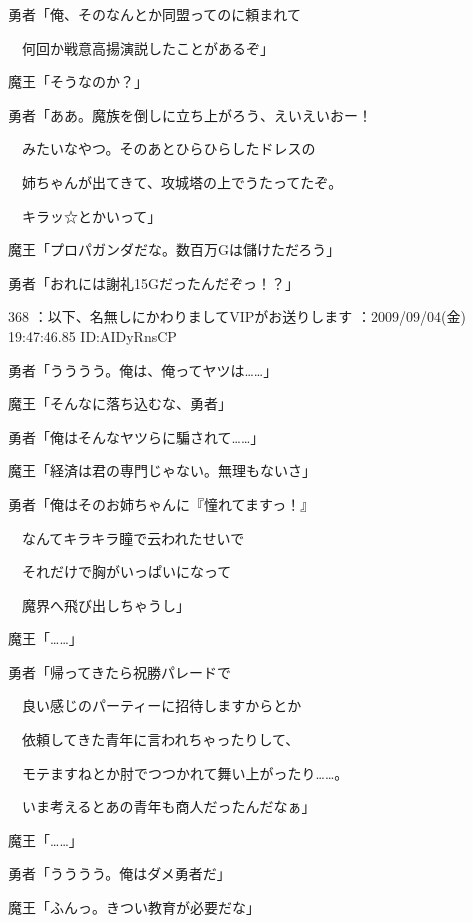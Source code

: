 \documentclass[a4j,twocolumn]{tarticle}
\begin{document}
勇者「俺、そのなんとか同盟ってのに頼まれて\par{} 
　何回か戦意高揚演説したことがあるぞ」 



魔王「そうなのか？」 



勇者「ああ。魔族を倒しに立ち上がろう、えいえいおー！\par{} 
　みたいなやつ。そのあとひらひらしたドレスの \par{}
　姉ちゃんが出てきて、攻城塔の上でうたってたぞ。\par{} 
　キラッ☆とかいって」 



魔王「プロパガンダだな。数百万Gは儲けただろう」\par{} 
勇者「おれには謝礼15Gだったんだぞっ！？」 

	
    
    

368 ：以下、名無しにかわりましてVIPがお送りします ：2009/09/04(金) 19:47:46.85 ID:AIDyRnsCP 


勇者「うううう。俺は、俺ってヤツは……」\par{} 
魔王「そんなに落ち込むな、勇者」 



勇者「俺はそんなヤツらに騙されて……」\par{} 
魔王「経済は君の専門じゃない。無理もないさ」 



勇者「俺はそのお姉ちゃんに『憧れてますっ！』\par{} 
　なんてキラキラ瞳で云われたせいで \par{}
　それだけで胸がいっぱいになって\par{} 
　魔界へ飛び出しちゃうし」 



魔王「……」 



勇者「帰ってきたら祝勝パレードで\par{} 
　良い感じのパーティーに招待しますからとか\par{} 
　依頼してきた青年に言われちゃったりして、\par{} 
　モテますねとか肘でつつかれて舞い上がったり……。\par{} 
　いま考えるとあの青年も商人だったんだなぁ」 



魔王「……」 



勇者「うううう。俺はダメ勇者だ」\par{} 
魔王「ふんっ。きつい教育が必要だな」 
\end{document}
